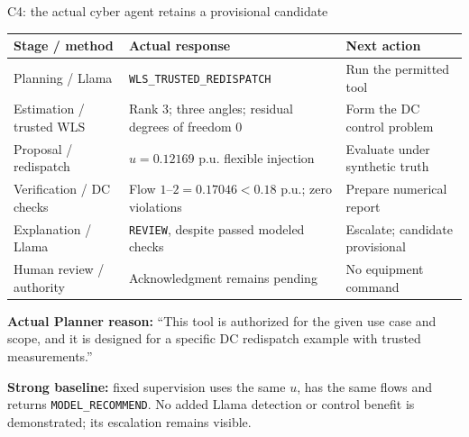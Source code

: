 \begin{frame}[t]{C4: the actual cyber agent retains a provisional candidate}
\deepdive
{}
\footnotesize
\begin{tabular}{@{}p{.23\linewidth}p{.43\linewidth}p{.28\linewidth}@{}}
\toprule Stage / method & Actual response & Next action \\
\midrule
Planning / Llama & \texttt{WLS\_TRUSTED\_REDISPATCH} & Run the permitted tool \\
Estimation / trusted WLS & Rank 3; three angles; residual degrees of freedom 0 & Form the DC control problem \\
Proposal / redispatch & $u=0.12169$ p.u. flexible injection & Evaluate under synthetic truth \\
Verification / DC checks & Flow $1$--$2=0.17046<0.18$ p.u.; zero violations & Prepare numerical report \\
Explanation / Llama & \texttt{REVIEW}, despite passed modeled checks & Escalate; candidate provisional \\
Human review / authority & Acknowledgment remains pending & No equipment command \\
\bottomrule
\end{tabular}
\par\smallskip
\textbf{Actual Planner reason:} ``This tool is authorized for the given use case and scope, and it is designed for a specific DC redispatch example with trusted measurements.''
\par\smallskip
\textbf{Strong baseline:} fixed supervision uses the same $u$, has the same flows and returns \texttt{MODEL\_RECOMMEND}. No added Llama detection or control benefit is demonstrated; its escalation remains visible.

\end{frame}
